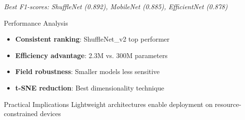 \documentclass[aspectratio=43]{beamer}
\begin{document}
\begin{frame}
\begin{columns}
\begin{column}{0.5\textwidth}
\begin{center}
                \vspace{0.5cm}
                \textit{Best F1-scores: ShuffleNet (0.892), MobileNet (0.885), EfficientNet (0.878)}
            \end{center}
            
            \begin{exampleblock}{Performance Analysis}
                \begin{itemize}
                    \item \textbf{Consistent ranking}: ShuffleNet\_v2 top performer
                    \item \textbf{Efficiency advantage}: 2.3M vs. 300M parameters
                    \item \textbf{Field robustness}: Smaller models less sensitive
                    \item \textbf{t-SNE reduction}: Best dimensionality technique
                \end{itemize}
            \end{exampleblock}
            
            \begin{block}{Practical Implications}
                Lightweight architectures enable deployment on resource-constrained devices
            \end{block}
        \end{column}
    \end{columns}
\end{frame}
\end{document}
